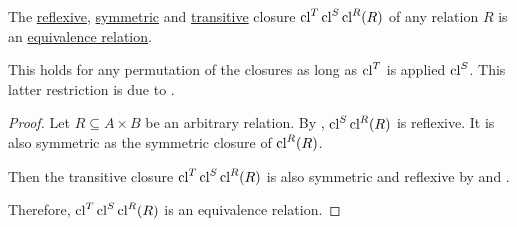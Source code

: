\begin{proposition}\label{thm:equivalence_closure}
  The \hyperref[def:relation_closures/reflexive]{reflexive}, \hyperref[def:relation_closures/symmetric]{symmetric} and \hyperref[def:relation_closures/transitive]{transitive} closure \( \operatorname{cl}^T \operatorname{cl}^S \operatorname{cl}^R (R) \) of any relation \( R \) is an \hyperref[def:equivalence_relation]{equivalence relation}.

  This holds for any permutation of the closures as long as \( \operatorname{cl}^T \) is applied  \( \operatorname{cl}^S \). This latter restriction is due to .
\end{proposition}
\begin{proof}
  Let \( R \subseteq A \times B \) be an arbitrary relation. By , \( \operatorname{cl}^S \operatorname{cl}^R (R) \) is reflexive. It is also symmetric as the symmetric closure of \( \operatorname{cl}^R(R) \).

  Then the transitive closure \( \operatorname{cl}^T \operatorname{cl}^S \operatorname{cl}^R (R) \) is also symmetric and reflexive by  and .

  Therefore, \( \operatorname{cl}^T \operatorname{cl}^S \operatorname{cl}^R (R) \) is an equivalence relation.
\end{proof}
